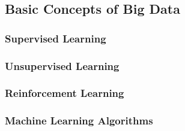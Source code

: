 \subsection{Basic Concepts of Big Data}

\subsubsection{Supervised Learning}

\subsubsection{Unsupervised Learning}

\subsubsection{Reinforcement Learning}

\subsubsection{Machine Learning Algorithms}